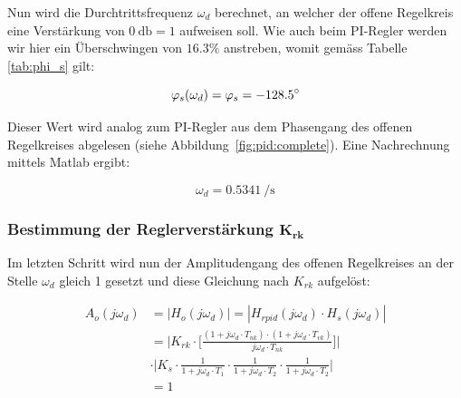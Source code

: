 Nun wird die  Durchtrittsfrequenz $\omega_d$ berechnet, an  welcher der offene
Regelkreis eine  Verst\"arkung von $\SI{0}{\decibel} =  1$ aufweisen soll. Wie
auch  beim  PI-Regler  werden  wir   hier  ein  \"Uberschwingen  von  $16.3\%$
anstreben, womit gem\"ass Tabelle \ref{tab:phi_s} gilt:

\begin{equation} \label{eq:pid:omega_d_target}
    \varphi_s(\omega_d) = \varphi_s = -128.5\degree
\end{equation}

Dieser   Wert   wird   analog   zum   PI-Regler   aus   dem   Phasengang   des
offenen Regelkreises  abgelesen (siehe Abbildung~\ref{fig:pid:complete}). Eine
Nachrechnung mittels Matlab ergibt:

\begin{equation} \label{eq:pid:omega_d_target}
    \omega_d = \SI{0.5341}{\per\second}
\end{equation}


\subsubsection{Bestimmung der Reglerverst\"arkung $\mathbf{K_{rk}}$}

Im letzten  Schritt wird  nun der Amplitudengang  des offenen  Regelkreises an
der  Stelle $\omega_d$  gleich 1  gesetzt  und diese  Gleichung nach  $K_{rk}$
aufgel\"ost:

\begin{equation} \label{eq:pid:h_o_k_rk_one}
    \begin{split}
        A_{o}(j\omega_d)    & = | H_{o}(j\omega_d) | = | H_{rpid}(j\omega_d) \cdot H_s(j\omega_d) |    \\
                            & = \Biggl \rvert
                                    K_{rk}
                                    \cdot
                                    \biggl[ \frac{(1 + j\omega_d \cdot T_{nk}) \cdot (1 + j\omega_d \cdot T_{vk}) }{ j\omega_d \cdot T_{nk} } \biggr] \Biggr \rvert \\
                            & \cdot
                                \Biggl \rvert
                                    K_s
                                    \cdot \frac{1}{1 + j\omega_d \cdot T_1}
                                    \cdot \frac{1}{1 + j\omega_d \cdot T_2}
                                    \cdot \frac{1}{1 + j\omega_d \cdot T_2}
                                    \Biggr \rvert \\
                            & = 1
    \end{split}
\end{equation}

